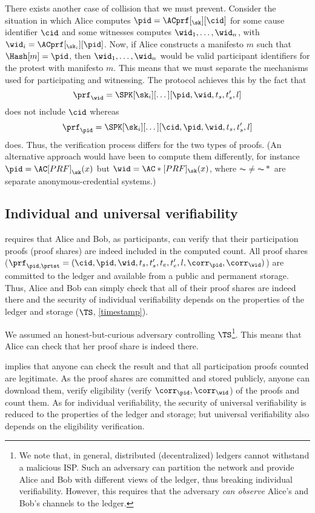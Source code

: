 There exists another case of collision that we must prevent.
Consider the situation in which Alice computes \(\pid = \ACprf[_\sk][\cid]\) for some cause identifier \(\cid\) and some witnesses computes \(\wid_1, \dotsc, \wid_n\), with \(\wid_i = \ACprf[_{\sk_i}][\pid]\).
Now, if Alice constructs a manifesto \(m\) such that \(\Hash[m] = \pid\), then \(\wid_1, \dotsc, \wid_n\) would be valid participant identifiers for the protest with manifesto \(m\).
This means that we must separate the mechanisms used for participating and witnessing.
The protocol achieves this by the fact that \[
  \prf_{\wid} = \SPK[\sk_i][\dotsc][\pid, \wid, t_s, t_s', l]
\]
does not include \(\cid\) whereas \[
  \prf_{\pid} = \SPK[\sk_i][\dotsc][\cid, \pid, \wid, t_s, t_s', l]
\]
does.
Thus, the verification process differs for the two types of proofs.
(An alternative approach would have been to compute them differently, for 
instance \(\pid = \AC[PRF]_{\sk}(x)\) but \(\wid = \AC*[PRF]_{\sk}(x)\), where 
\(\AC \neq \AC*\) are separate anonymous-credential systems.)

\subsection{Individual and universal verifiability}%
\label{analysis-individual}%
\label{analysis-universal}

 requires that Alice and Bob, as participants, can verify 
that their participation proofs (\ie proof shares) are indeed included in the 
computed count.
All proof shares (\ie \(\prf_{\pid, \prtst} = (\cid, \pid, \wid, t_s, t_s', 
  t_e, t_e', l, \corr_\pid, \corr_\wid)\)) are committed to the ledger and 
available from a public and permanent storage.
Thus, Alice and Bob can simply check that all of their proof shares are indeed 
there and the security of individual verifiability depends on the properties of 
the ledger and storage (\(\TS\), \cref{timestamp}).

We assumed an honest-but-curious adversary controlling \(\TS\)\footnote{%
  We note that, in general, distributed (decentralized) ledgers cannot 
  withstand a malicious \ac{ISP}.
  Such an adversary can partition the network and provide Alice and Bob with 
  different views of the ledger, thus breaking individual verifiability.
  However, this requires that the adversary \emph{can observe} Alice's and 
  Bob's channels to the ledger.
}.
This means that Alice can check that her proof share is indeed there.

 implies that anyone can check the result and that all 
participation proofs counted are legitimate.
As the proof shares are committed and stored publicly, anyone can
download them, verify eligibility (\ie verify \(\corr_\pid,
\corr_{\wid}\)) of the proofs and count them.
As for individual verifiability, the security of universal verifiability is 
reduced to the properties of the ledger and storage; but universal 
verifiability also depends on the eligibility verification.
